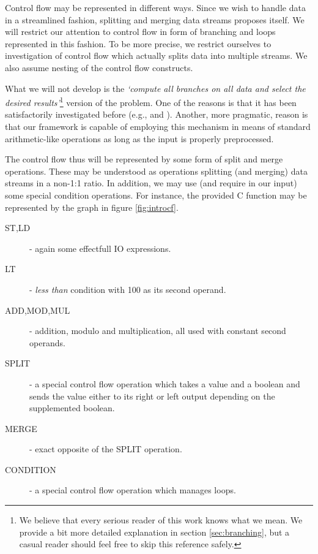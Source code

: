 Control flow may be represented in different ways. Since we wish to handle data in a streamlined fashion, splitting and merging data streams proposes itself. We will restrict our attention to control flow in form of branching and loops represented in this fashion. To be more precise, we restrict ourselves to investigation of control flow which actually splits data into multiple streams. We also assume nesting of the control flow constructs.

\begin{rem}
  What we will not develop is the \emph{`compute all branches on all data and select the desired results'}\footnote{We believe that every serious reader of this work knows what we mean. We provide a bit more detailed explanation in section \ref{sec:branching}, but a casual reader should feel free to skip this reference safely.} version of the problem. One of the reasons is that it has been satisfactorily investigated before (e.g., \cite{select} and \cite{select2}). Another, more pragmatic, reason is that our framework is capable of employing this mechanism in means of standard arithmetic-like operations as long as the input is properly preprocessed.
\end{rem}


The control flow thus will be represented by some form of split and merge operations. These may be understood as operations splitting (and merging) data streams in a non-1:1 ratio. In addition, we may use (and require in our input) some special condition operations. For instance, the provided C function may be represented by the graph in figure \ref{fig:introcf}.


\begin{description}
  \item[ST,LD] - again some effectfull IO expressions.
  \item[LT] - \emph{less than} condition with 100 as its second operand.
  \item[ADD,MOD,MUL] - addition, modulo and multiplication, all used with constant second operands.
  \item[SPLIT] - a special control flow operation which takes a value and a boolean and sends the value either to its right or left output depending on the supplemented boolean.
  \item[MERGE] - exact opposite of the SPLIT operation.
  \item[CONDITION] - a special control flow operation which manages loops. 
\end{description}

